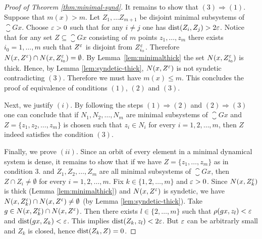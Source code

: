 \begin{proof}[Proof of Theorem \ref{thm:minimal-synd}]
It remains to show that $(3)\Rightarrow(1)$.  
Suppose that $m(x)>m$. Let $Z_1, \ldots Z_{m+1}$ be disjoint minimal subsystems of $\closure{Gx}$.
Choose $\varepsilon>0$ such that for any $i\neq j$ one has $\text{dist}(Z_i,Z_j)>2\varepsilon$. 
%
Notice that for any set $Z\subseteq \closure{Gx}$ consisting of $m$ points $z_1,\ldots, z_m$ there exists $i_0=1,\ldots,m$ such that  $Z^{\varepsilon}$ is disjoint from $Z_{i_0}^{\varepsilon}$. 
%
Therefore $N(x, Z^{\varepsilon})\cap N(x, Z_{i_0}^{\varepsilon})=\emptyset$. 
%
By Lemma~\ref{lem:minimalthick} the set $N(x,Z_{i_0}^{\varepsilon})$ is thick. Hence, by Lemma \ref{lem:syndetic-thick}, $N(x,Z^{\varepsilon})$ is not syndetic contradicting $(3)$. 
%
Therefore we must have $m(x)\leq m$.
This concludes the proof of equivalence of conditions $(1)$, $(2)$ and $(3)$. 

Next, we justify $(i)$.
%
By following the steps $(1)\Rightarrow (2)$ and $(2)\Rightarrow (3)$ one can conclude that if $N_1,N_2,\ldots, N_m$ are minimal subsystems of $\closure{Gx}$ and $Z=\{z_1,z_2,\ldots,z_m\}$ is chosen such that $z_i\in N_i$ for every $i=1,2,\ldots,m$, then $Z$ indeed satisfies the condition $(3)$.

Finally, we prove $(ii)$. Since an orbit of every element in a minimal dynamical system is dense, it remains to show that if we have $Z=\{z_1,\ldots, z_m\}$ as in condition 3. and $Z_1, Z_2,\ldots, Z_m$ are all minimal subsystems of $\closure{Gx}$, then $Z\cap Z_i\neq\emptyset$ for every $i=1,2,\ldots,m$. 
%
Fix $k\in\{1,2,\ldots,m\}$ and $\varepsilon>0$. 
%
Since $N(x,Z_k^{\varepsilon})$ is thick (Lemma \ref{lem:minimalthick}) and $N(x,Z^{\varepsilon})$ is syndetic, we have $N(x,Z_k^{\varepsilon})\cap N(x,Z^{\varepsilon})\neq\emptyset$ (by Lemma \ref{lem:syndetic-thick}).
%
Take $g\in N(x,Z_k^{\varepsilon})\cap N(x,Z^{\varepsilon})$. 
%
Then there exists $l\in\{2,\ldots,m\}$ such that  $\rho(gx, z_l)<\varepsilon$ and  $\operatorname{dist}(gx, Z_k)<\varepsilon$. 
%
This implies $\operatorname{dist}(Z_k,z_l)<2\varepsilon$. But $\varepsilon$ can be arbitrarly small and $Z_k$ is closed, hence $\operatorname{dist}(Z_k,Z)=0$. 
\end{proof}


